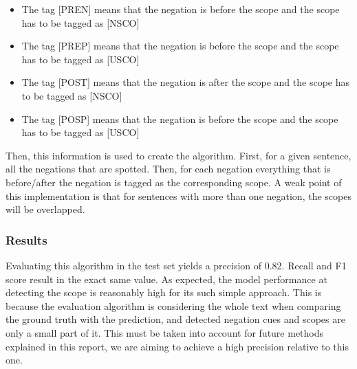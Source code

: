 \documentclass{article}
\begin{document}
\begin{itemize}
	\item The tag [PREN] means that the negation is before the scope and the scope has to be tagged as [NSCO]
	\item The tag [PREP] means that the negation is before the scope and the scope has to be tagged as [USCO]
	\item The tag [POST] means that the negation is after the scope and the scope has to be tagged as [NSCO]
	\item The tag [POSP] means that the negation is before the scope and the scope has to be tagged as [USCO]
\end{itemize}

Then, this information is used to create the algorithm. First, for a given sentence, all the negations that
are spotted. Then, for each negation everything that is before/after the negation is tagged as the corresponding
scope. A weak point of this implementation is that for sentences with more than one negation, the scopes will be
overlapped.

\subsubsection*{Results}
Evaluating this algorithm in the test set yields a precision of 0.82. Recall and F1 score result in the exact
same value. As expected, the model performance at detecting the scope is reasonably high for its such simple
approach. This is because the evaluation algorithm is considering the whole text when comparing the ground
truth with the prediction, and detected negation cues and scopes are only a small part of it. This must be
taken into account for future methods explained in this report, we are aiming to achieve a high precision
relative to this one.
\end{document}
